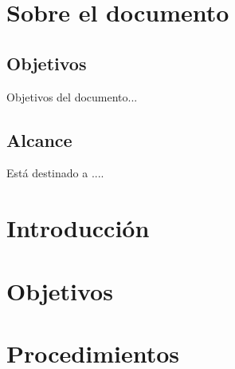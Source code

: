 \documentclass{GVT_CONAE_Class}
\begin{document}
\section{Sobre el documento}

    \subsection{Objetivos}
    
    Objetivos del documento...

    \subsection{Alcance}
    Está destinado a ....
    
    \printglossary[type=\acronymtype, numberedsection, title=Lista de acrónimos y abreviaturas]


\section{Introducción}



\section{Objetivos}



\section{Procedimientos}
\end{document}

